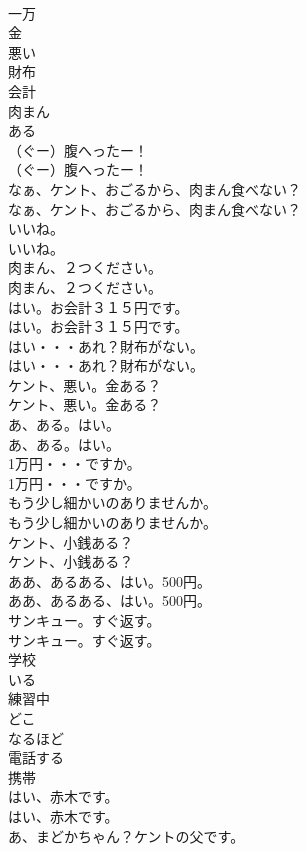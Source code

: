 \documentclass[8pt]{extreport}
\begin{document}
\begin{CJK}{UTF8}{min}
\\	一万
\\	金
\\	悪い
\\	財布
\\	会計
\\	肉まん
\\	ある
\\	（ぐー）腹へったー！	
\\	（ぐー）腹へったー！ 
\\	なぁ、ケント、おごるから、肉まん食べない？	
\\	なぁ、ケント、おごるから、肉まん食べない？ 
\\	いいね。	
\\	いいね。 
\\	肉まん、２つください。	
\\	肉まん、２つください。 
\\	はい。お会計３１５円です。	
\\	はい。お会計３１５円です。 
\\	はい・・・あれ？財布がない。	
\\	はい・・・あれ？財布がない。 
\\	ケント、悪い。金ある？	
\\	ケント、悪い。金ある？ 
\\	あ、ある。はい。	
\\	あ、ある。はい。 
\\	1万円・・・ですか。	
\\	1万円・・・ですか。 
\\	もう少し細かいのありませんか。	
\\	もう少し細かいのありませんか。 
\\	ケント、小銭ある？	
\\	ケント、小銭ある？ 
\\	ああ、あるある、はい。500円。	
\\	ああ、あるある、はい。500円。 
\\	サンキュー。すぐ返す。	
\\	サンキュー。すぐ返す。 
\\	学校
\\	いる
\\	練習中
\\	どこ
\\	なるほど
\\	電話する
\\	携帯
\\	はい、赤木です。	
\\	はい、赤木です。 
\\	あ、まどかちゃん？ケントの父です。	

\end{CJK}
\end{document}
